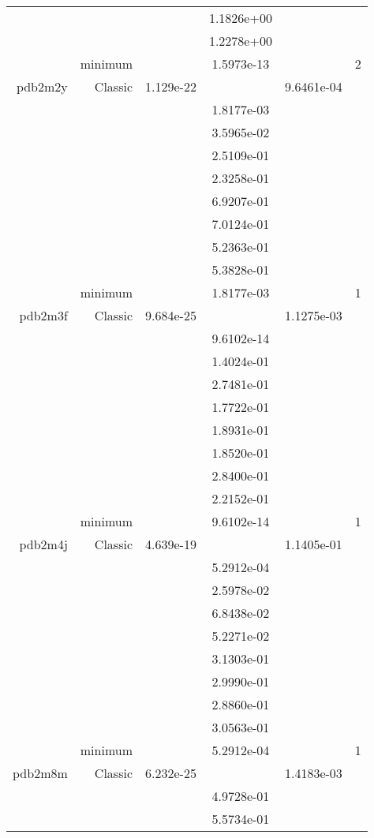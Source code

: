 \begin{xltabular}{\textwidth}{r|rS[table-format=1.3e+2]S[table-format=1.4e+2]S[table-format=1.4e+2]S[table-format=-1.5]}
&  &  & 1.1826e+00 & & \\
&  &  & 1.2278e+00 & & \\
& minimum &  & 1.5973e-13 & & 2 \\  \addlinespace
pdb2m2y & Classic & 1.129e-22 &  & 9.6461e-04 & \\
&  &  & 1.8177e-03 & & \\
&  &  & 3.5965e-02 & & \\
&  &  & 2.5109e-01 & & \\
&  &  & 2.3258e-01 & & \\
&  &  & 6.9207e-01 & & \\
&  &  & 7.0124e-01 & & \\
&  &  & 5.2363e-01 & & \\
&  &  & 5.3828e-01 & & \\
& minimum &  & 1.8177e-03 & & 1 \\  \addlinespace
pdb2m3f & Classic & 9.684e-25 &  & 1.1275e-03 & \\
&  &  & 9.6102e-14 & & \\
&  &  & 1.4024e-01 & & \\
&  &  & 2.7481e-01 & & \\
&  &  & 1.7722e-01 & & \\
&  &  & 1.8931e-01 & & \\
&  &  & 1.8520e-01 & & \\
&  &  & 2.8400e-01 & & \\
&  &  & 2.2152e-01 & & \\
& minimum &  & 9.6102e-14 & & 1 \\  \addlinespace
pdb2m4j & Classic & 4.639e-19 &  & 1.1405e-01 & \\
&  &  & 5.2912e-04 & & \\
&  &  & 2.5978e-02 & & \\
&  &  & 6.8438e-02 & & \\
&  &  & 5.2271e-02 & & \\
&  &  & 3.1303e-01 & & \\
&  &  & 2.9990e-01 & & \\
&  &  & 2.8860e-01 & & \\
&  &  & 3.0563e-01 & & \\
& minimum &  & 5.2912e-04 & & 1 \\  \addlinespace
pdb2m8m & Classic & 6.232e-25 &  & 1.4183e-03 & \\
&  &  & 4.9728e-01 & & \\
&  &  & 5.5734e-01 & & \\

\end{xltabular}
